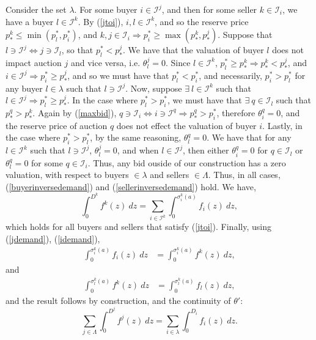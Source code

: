\documentclass[12pt]{article}
\theoremstyle{definition}
\newcommand{\mcI}{\mathcal{I}}
\newcommand{\g}{\sigma}
\begin{document}
\begin{multicols}{2}
Consider the set $\lambda$. For some buyer $i\in\mcI^j$, and then for
some seller $k \in \mcI_i$, we have a buyer $l \in \mcI^k$. By (\ref{jtoi}), $i,l \in \mcI^k$, and so the reserve price $p_*^k \le \min(p_l^*,
p_i^*)$, and $k, j\in \mcI_i\Rightarrow p_i^* \ge \max(p_*^k, p_*^j)$.
Suppose that $l \ni \mcI^j\Leftrightarrow j \ni \mcI_l$, so
that $p_l^* < p_*^j$. We have that
the valuation of buyer $l$ does not impact auction $j$ and vice versa, i.e. $\theta_l^j = 0$. Since $l\in\mcI^k$, $p_l^* \ge p_*^k\Rightarrow
p_*^k < p_*^j$, and $i\in\mcI^j \Rightarrow p_i^* \ge p_*^j$, and so we must
have that $p_l^* < p_i^*$,
and necessarily, $p_i^* > p_l^*$ for
any buyer $l\in\lambda$ such that $l\ni \mcI^j$. Now, suppose $\exists \ l\in\mcI^k$ such that $l\in\mcI^j \Rightarrow p_l^* \ge
p_*^j$. In the case where $p_l^* > p_i^*$, we must have that 
$\exists \ q \in \mcI_l$ such that $p_*^q > p_*^k$. %
Again by (\ref{maxbid}), $q\ni\mcI_i \Leftrightarrow i
\ni\mcI^q \Rightarrow p_*^q >
p_i^*$, therefore $\theta_i^q = 0$, and the reserve price of auction $q$ does not effect the valuation of
buyer $i$. 
Lastly, 
in the case where $p_i^* > p_l^*$, by the same reasoning, $\theta_l^q = 0$.
We have that for any $l\in\mcI^k$ such that $l\ni
\mcI^j$, $\theta_l^j =0$, and when $l\in \mcI^j$, then either $\theta_i^q =0$
for $q\in\mcI_l$ or $\theta_l^q = 0$ for some $q\in\mcI_i$. Thus, any bid ouside of
our construction
has a zero valuation, with respect to buyers $\in\lambda$ and sellers
$\in\Lambda$. Thus, in all cases,
(\ref{buyerinversedemand}) and (\ref{sellerinversedemand}) hold.
We have,
\begin{equation}\label{idemand}
    \displaystyle\int_0^{D^k} f^k(z) \ dz = \sum_{i\in\mcI^k}\int_0^{\g_i^k(a)}
f_i(z) \ dz,
\end{equation}
which holds for all buyers and sellers that satisfy (\ref{jtoi}).
Finally, using (\ref{jdemand}), (\ref{idemand}), 
\begin{align*}
    \int_0^{\g_i^k(a)} f_i(z) \ dz &= \int_0^{\g_i^k(a)} f^k(z) \ dz,
\end{align*}
and
\begin{align*}
    \int_0^{\g_l^k(a)} f^k(z) \ dz &= \int_0^{\g_l^k(a)} f_l(z) \ dz,
\end{align*}
and the result follows by construction, and the continuity of $\theta'$:
\begin{equation}
    \displaystyle\sum_{j\in\Lambda} \int_0^{D^j} f^j(z) \ dz =
\sum_{i\in\lambda}\int_0^{D_i} f_i(z) \ dz.
\end{equation}


\end{multicols}
\end{document}
